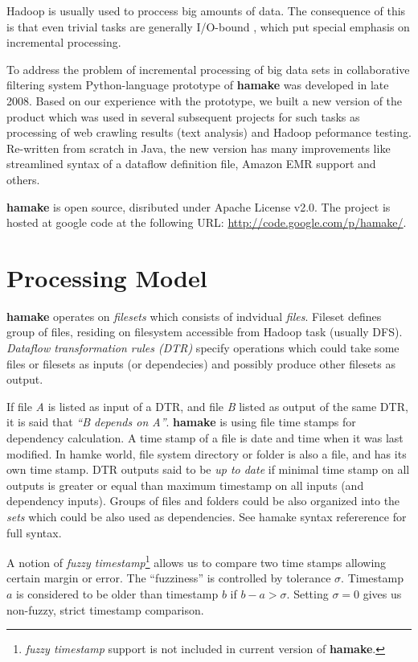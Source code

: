 \documentclass{article}
\begin{document}
Hadoop is usually used to proccess big amounts of data. The
consequence of this is that even trivial tasks are generally I/O-bound
\cite{hadoopattwitter},\cite{hs2010hadoopbench} which put special
emphasis on incremental processing.

To address the problem of incremental processing of big data sets in
collaborative filtering system Python-language prototype of
\textbf{hamake} was developed in late 2008. Based on our experience
with the prototype, we built a new version of the product which was
used in several subsequent projects for such tasks as processing of
web crawling results (text analysis) and Hadoop peformance
testing. Re-written from scratch in Java, the new version has many
improvements like streamlined syntax of a dataflow definition file,
Amazon EMR support and others.

\textbf{hamake} is open source, disributed under Apache License
v2.0. The project is hosted at google code at the following URL:
\url{http://code.google.com/p/hamake/}.

\section{Processing Model}

\textbf{hamake} operates on \textit{filesets} which consists of indvidual
\textit{files}. Fileset defines group of files, residing on filesystem
accessible from Hadoop task (usually DFS). \textit{Dataflow
  transformation rules (DTR)} specify operations which could take some
files or filesets as inputs (or dependecies) and possibly produce
other filesets as output.

If file \textit{A} is listed as input of a DTR, and file \textit{B}
listed as output of the same DTR, it is said that \textit{``B depends
  on A''}. \textbf{hamake} is using file time stamps for dependency
calculation. A time stamp of a file is date and time when it was last
modified.  In hamke world, file system directory or folder is also a
file, and has its own time stamp. DTR outputs said to be \textit{up to
  date} if minimal time stamp on all outputs is greater or equal than
maximum timestamp on all inputs (and dependency inputs). Groups of
files and folders could be also organized into the \emph{sets} which
could be also used as dependencies. See hamake syntax
refererence\cite{hamakesyntax} for full syntax.

A notion of \textit{fuzzy timestamp}\footnote{\textit{fuzzy timestamp}
  support is not included in current version of \textbf{hamake}.}
allows us to compare two time stamps allowing certain margin or
error. The ``fuzziness'' is controlled by tolerance
$\sigma$. Timestamp $a$ is considered to be older than timestamp $b$
if $b-a>\sigma$. Setting $\sigma=0$ gives us non-fuzzy, strict
timestamp comparison.
\end{document}
